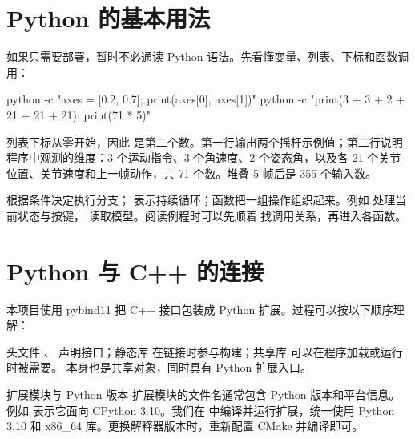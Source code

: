 \section{Python 的基本用法}
如果只需要部署，暂时不必通读 Python 语法。先看懂变量、列表、下标和函数调用：
\begin{command}
python -c "axes = [0.2, 0.7]; print(axes[0], axes[1])"
python -c "print(3 + 3 + 2 + 21 + 21 + 21); print(71 * 5)"
\end{command}
列表下标从零开始，因此  是第二个数。第一行输出两个摇杆示例值；第二行说明程序中观测的维度：3 个运动指令、3 个角速度、2 个姿态角，以及各 21 个关节位置、关节速度和上一帧动作，共 71 个数。堆叠 5 帧后是 355 个输入数。

 根据条件决定执行分支； 表示持续循环；函数把一组操作组织起来。例如  处理当前状态与按键， 读取模型。阅读例程时可以先顺着  找调用关系，再进入各函数。

\section{Python 与 C++ 的连接}
本项目使用 pybind11 把 C++ 接口包装成 Python 扩展。过程可以按以下顺序理解：
\begin{center}
\end{center}

头文件 、 声明接口；静态库  在链接时参与构建；共享库  可以在程序加载或运行时被需要。 本身也是共享对象，同时具有 Python 扩展入口。

\begin{remark}{扩展模块与 Python 版本}
扩展模块的文件名通常包含 Python 版本和平台信息。例如  表示它面向 CPython 3.10。我们在  中编译并运行扩展，统一使用 Python 3.10 和 x86\_64 库。更换解释器版本时，重新配置 CMake 并编译即可。
\end{remark}

